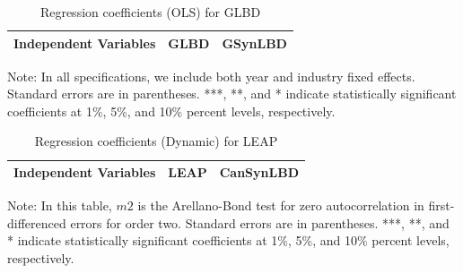 \begin{table}[H]
  \centering
 \caption{Regression coefficients (OLS) for GLBD} \label{OLS} \medskip
\renewcommand{\arraystretch}{1}
\begin{tabular}{l|c |c}
\toprule
\textbf{Independent Variables}&\textbf{GLBD} &  \textbf{GSynLBD}\\
\midrule

   \bottomrule
  \end{tabular} 
\begin{tablenotes}
\small
\item Note: In all specifications, we include both year and industry fixed effects. Standard errors are in parentheses.  ***, **, and * indicate statistically significant coefficients at 1\%, 5\%, and 10\% percent levels, respectively.
 \end{tablenotes}
\end{table}



\begin{table}[H]
  \centering
\begin{threeparttable}
 \caption{Regression coefficients (Dynamic) for LEAP} \label{Dynamic - GMM} \medskip
\renewcommand{\arraystretch}{1}
\begin{tabular}{l|c c| c c}
\toprule
\textbf{Independent Variables}&\multicolumn{2}{c|}{\textbf{LEAP}} &  \multicolumn{2}{c}{\textbf{CanSynLBD}}\\
\midrule

   \bottomrule
  \end{tabular} 
\begin{tablenotes}
\small
\item Note: In this table, $m2$ is the Arellano-Bond test for zero autocorrelation in first-differenced errors for order two. Standard errors are in parentheses. ***, **, and * indicate statistically significant coefficients at 1\%, 5\%, and 10\% percent levels, respectively.
 \end{tablenotes}
 \end{threeparttable}
\end{table}

